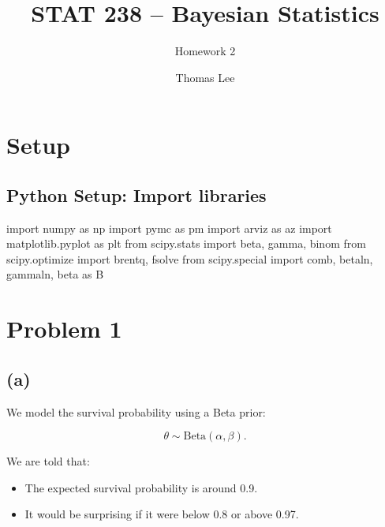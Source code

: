 \documentclass[
  letterpaper,
  DIV=11,
  numbers=noendperiod]{scrartcl}
\title{STAT 238 -- Bayesian Statistics}
\subtitle{Homework 2}
\author{Thomas Lee}
\date{}
\newenvironment{Shaded}{\begin{snugshade}}{\end{snugshade}}
\newcommand{\ImportTok}[1]{\textcolor[rgb]{0.00,0.46,0.62}{#1}}
\newcommand{\NormalTok}[1]{\textcolor[rgb]{0.00,0.23,0.31}{#1}}
\providecommand{\tightlist}{%
  \setlength{\itemsep}{0pt}\setlength{\parskip}{0pt}}\usepackage{longtable,booktabs,array}
\begin{document}
\maketitle


\section{Setup}\label{setup}

\subsection{Python Setup: Import
libraries}\label{python-setup-import-libraries}

\begin{Shaded}
\begin{Highlighting}[]
\ImportTok{import}\NormalTok{ numpy }\ImportTok{as}\NormalTok{ np}
\ImportTok{import}\NormalTok{ pymc }\ImportTok{as}\NormalTok{ pm}
\ImportTok{import}\NormalTok{ arviz }\ImportTok{as}\NormalTok{ az}
\ImportTok{import}\NormalTok{ matplotlib.pyplot }\ImportTok{as}\NormalTok{ plt}
\ImportTok{from}\NormalTok{ scipy.stats }\ImportTok{import}\NormalTok{ beta, gamma, binom}
\ImportTok{from}\NormalTok{ scipy.optimize }\ImportTok{import}\NormalTok{ brentq, fsolve}
\ImportTok{from}\NormalTok{ scipy.special }\ImportTok{import}\NormalTok{ comb, betaln, gammaln, beta }\ImportTok{as}\NormalTok{ B}
\end{Highlighting}
\end{Shaded}

\section{Problem 1}\label{problem-1}

\subsection{(a)}\label{a}

We model the survival probability using a Beta prior:

\[
\theta \sim \text{Beta}(\alpha,\beta).
\]

We are told that:

\begin{itemize}
\tightlist
\item
  The expected survival probability is around 0.9.
\item
  It would be surprising if it were below 0.8 or above 0.97.
\end{itemize}
\end{document}
